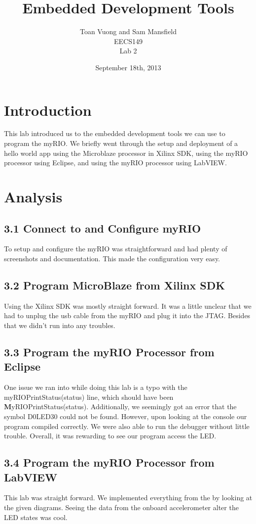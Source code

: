 \documentclass[10pt]{article}
\begin{document}
\title{Embedded Development Tools}
\author{Toan Vuong and Sam Mansfield\\
        EECS149\\
        Lab 2}
\date{September 18th, 2013}
\maketitle

\section*{Introduction}
  This lab introduced us to the embedded development tools we can use to program the myRIO. We briefly went through the setup and deployment of a hello world app using the Microblaze processor in Xilinx SDK, using the myRIO processor using Eclipse, and using the myRIO processor using LabVIEW.
\section*{Analysis}
  \subsection*{3.1 Connect to and Configure myRIO}
    To setup and configure the myRIO was straightforward and had plenty of screenshots and documentation. This made the configuration very easy.
  \subsection*{3.2 Program MicroBlaze from Xilinx SDK}
    Using the Xilinx SDK was mostly straight forward. It was a little unclear that we had to unplug the usb cable from the myRIO and plug it into the JTAG. Besides that we didn't run into any troubles.
  \subsection*{3.3 Program the myRIO Processor from Eclipse}
    One issue we ran into while doing this lab is a typo with the myRIO\textunderscore PrintStatus(status) line, which should have been \textbf{M}yRIO\textunderscore PrintStatus(status). Additionally, we seemingly got an error that the symbol D0LED30 could not be found. However, upon looking at the console our program compiled correctly. We were also able to run the debugger without little trouble. Overall, it was rewarding to see our program access the LED.
  \subsection*{3.4 Program the myRIO Processor from LabVIEW}
    This lab was straight forward. We implemented everything from the by looking at the given diagrams. Seeing the data from the onboard accelerometer alter the LED states was cool. 
\end{document}
